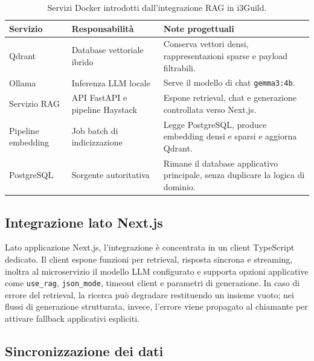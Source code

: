 \begin{table}[ht]
  \centering
  \caption{Servizi Docker introdotti dall'integrazione RAG in i3Guild.}
  \label{tab:docker_services}
  \small
  \begin{tabular}{L{3.3cm}L{4.1cm}L{5.6cm}}
    \toprule
    \textbf{Servizio} & \textbf{Responsabilità} & \textbf{Note progettuali} \\
    \midrule
    Qdrant & Database vettoriale ibrido & Conserva vettori densi,
      rappresentazioni sparse e payload filtrabili. \\
    Ollama & Inferenza LLM locale & Serve il modello di chat
      \texttt{gemma3:4b}. \\
    Servizio RAG & API FastAPI e pipeline Haystack & Espone retrieval, chat e
      generazione controllata verso Next.js. \\
    Pipeline embedding & Job batch di indicizzazione & Legge PostgreSQL,
      produce embedding densi e sparsi e aggiorna Qdrant. \\
    PostgreSQL & Sorgente autoritativa & Rimane il database applicativo
      principale, senza duplicare la logica di dominio. \\
    \bottomrule
  \end{tabular}
\end{table}

\subsection{Integrazione lato Next.js}
\label{subsec:nextjs_integration}

Lato applicazione Next.js, l'integrazione è concentrata in un client TypeScript
dedicato. Il client espone funzioni per retrieval, risposta sincrona e
streaming, inoltra al microservizio il modello LLM configurato e supporta
opzioni applicative come \texttt{use\_rag}, \texttt{json\_mode}, timeout client
e parametri di generazione. In caso di errore del retrieval, la ricerca può
degradare restituendo un insieme vuoto; nei flussi di generazione strutturata,
invece, l'errore viene propagato al chiamante per attivare fallback applicativi
espliciti.

\subsection{Sincronizzazione dei dati}
\label{subsec:data_sync}

